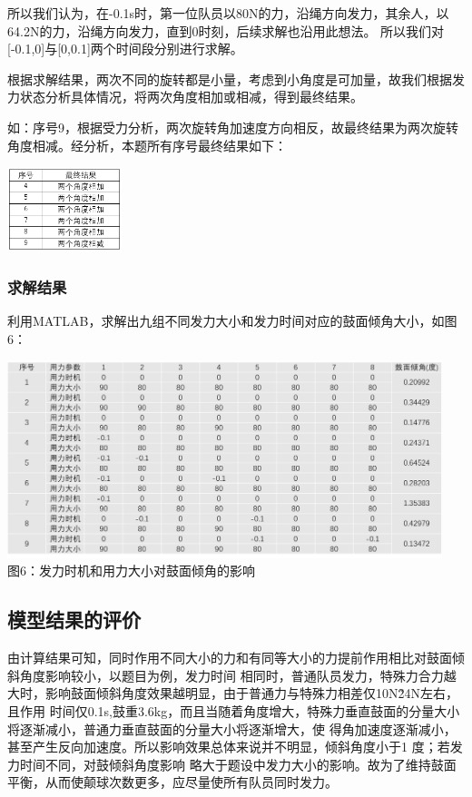 \documentclass[UTF8]{article}
\begin{document}
所以我们认为，在-0.1s时，第一位队员以80N的力，沿绳方向发力，其余人，以64.2N的力，沿绳方向发力，直到0时刻，后续求解也沿用此想法。
所以我们对[-0.1,0]与[0,0.1]两个时间段分别进行求解。

根据求解结果，两次不同的旋转都是小量，考虑到小角度是可加量，故我们根据发力状态分析具体情况，将两次角度相加或相减，得到最终结果。

如：序号9，根据受力分析，两次旋转角加速度方向相反，故最终结果为两次旋转角度相减。经分析，本题所有序号最终结果如下：
\begin{center}
    \includegraphics[width=0.25\textwidth]{figure15.png}\\
\end{center}
\subsubsection{求解结果}
利用MATLAB，求解出九组不同发力大小和发力时间对应的鼓面倾角大小，如图6：
\begin{center}
    \includegraphics[width=0.95\textwidth]{figure6.png}\\
    图6：发力时机和用力大小对鼓面倾角的影响
\end{center}

\subsection{模型结果的评价}
由计算结果可知，同时作用不同大小的力和有同等大小的力提前作用相比对鼓面倾斜角度影响较小，以题目为例，发力时间
相同时，普通队员发力，特殊力合力越大时，影响鼓面倾斜角度效果越明显，由于普通力与特殊力相差仅10N\~24N左右，且作用
时间仅0.1s,鼓重3.6kg，而且当随着角度增大，特殊力垂直鼓面的分量大小将逐渐减小，普通力垂直鼓面的分量大小将逐渐增大，使
得角加速度逐渐减小，甚至产生反向加速度。所以影响效果总体来说并不明显，倾斜角度小于1 度；若发力时间不同，对鼓倾斜角度影响
略大于题设中发力大小的影响。故为了维持鼓面平衡，从而使颠球次数更多，应尽量使所有队员同时发力。
\end{document}
